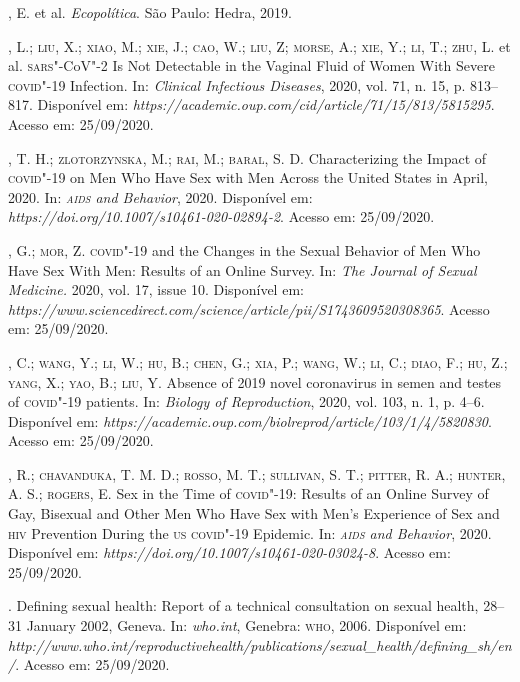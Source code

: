 \begin{bibliohedra}
, E. et al. \emph{Ecopolítica}. São Paulo: Hedra, 2019.

, L.; \textsc{liu}, X.; \textsc{xiao}, M.; \textsc{xie}, J.; \textsc{cao}, W.; \textsc{liu}, Z; \textsc{morse}, A.; \textsc{xie},
Y.; \textsc{li}, T.; \textsc{zhu}, L. et al. \textsc{sars}"-CoV"-2 Is Not Detectable in the Vaginal
Fluid of Women With Severe \textsc{covid}"-19 Infection. In: \emph{Clinical
Infectious Diseases}, 2020, vol. 71, n. 15, p. 813--817. Disponível em:
\emph{https://academic.oup.com/cid/article/71/15/813/5815295}. Acesso em:
25/09/2020.

, T. H.; \textsc{zlotorzynska}, M.; \textsc{rai}, M.; \textsc{baral}, S. D. Characterizing
the Impact of \textsc{covid}"-19 on Men Who Have Sex with Men Across the United
States in April, 2020. In: \emph{\textsc{aids} and Behavior}, 2020. Disponível
em: \emph{https://doi.org/10.1007/s10461-020-02894-2}. Acesso em:
25/09/2020.

, G.; \textsc{mor}, Z. \textsc{covid}"-19 and the Changes in the Sexual Behavior of
Men Who Have Sex With Men: Results of an Online Survey. In: \emph{The
Journal of Sexual Medicine.} 2020, vol. 17, issue 10. Disponível em:
\emph{https://www.sciencedirect.com/science/article/pii/S1743609520308365}.
Acesso em: 25/09/2020.

, C.; \textsc{wang}, Y.; \textsc{li}, W.; \textsc{hu}, B.; \textsc{chen}, G.; \textsc{xia}, P.; \textsc{wang}, W.; \textsc{li}, C.;
\textsc{diao}, F.; \textsc{hu}, Z.; \textsc{yang}, X.; \textsc{yao}, B.; \textsc{liu}, Y. Absence of 2019 novel
coronavirus in semen and testes of \textsc{covid}"-19 patients. In: \emph{Biology
of Reproduction}, 2020, vol. 103, n. 1, p. 4--6. Disponível em:
\emph{https://academic.oup.com/biolreprod/article/103/1/4/5820830}.
Acesso em: 25/09/2020.

, R.; \textsc{chavanduka}, T. M. D.; \textsc{rosso}, M. T.; \textsc{sullivan}, S. T.;
\textsc{pitter}, R. A.; \textsc{hunter}, A. S.; \textsc{rogers}, E. Sex in the Time of \textsc{covid}"-19:
Results of an Online Survey of Gay, Bisexual and Other Men Who Have Sex
with Men's Experience of Sex and \textsc{hiv} Prevention During the \textsc{us} \textsc{covid}"-19
Epidemic. In: \emph{\textsc{aids} and Behavior}, 2020. Disponível em:
\emph{https://doi.org/10.1007/s10461-020-03024-8}. Acesso em: 25/09/2020.

. Defining sexual health: Report of a technical consultation on
sexual health, 28--31 January 2002, Geneva. In: \emph{who.int}, Genebra:
\textsc{who}, 2006. Disponível em:
\emph{http://www.who.int/reproductivehealth/publications/sexual\_health/defining\_sh/en/}.
Acesso em: 25/09/2020.
\end{bibliohedra}

